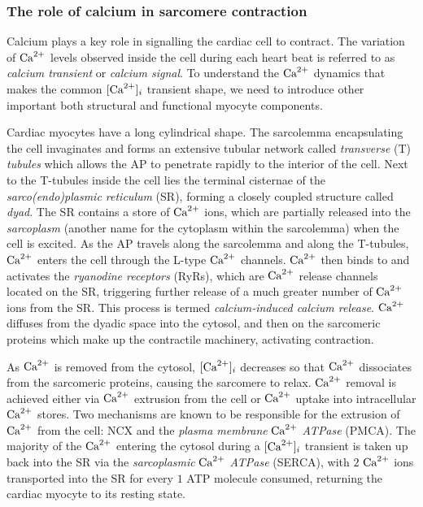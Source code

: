 

%
%
%
\subsubsection{The role of calcium in sarcomere contraction}\label{ch1:the_role_of_calcium_in_sarcomere_contraction}
Calcium plays a key role in signalling the cardiac cell to contract. The variation of $\textrm{Ca}^{2+}$ levels observed inside the cell during each heart beat is referred to as \textit{calcium transient} or \textit{calcium signal}. To understand the $\textrm{Ca}^{2+}$ dynamics that makes the common $[\textrm{Ca}^{2+}]_{i}$ transient shape, we need to introduce other important both structural and functional myocyte components.

\vspace{0.2cm}
Cardiac myocytes have a long cylindrical shape. The sarcolemma encapsulating the cell invaginates and forms an extensive tubular network called \textit{transverse} (\acs{T}) \textit{tubules} which allows the AP to penetrate rapidly to the interior of the cell. Next to the T-tubules inside the cell lies the terminal cisternae of the \textit{sarco(endo)plasmic reticulum} (\acs{SR}), forming a closely coupled structure called \textit{dyad}. The SR contains a store of $\textrm{Ca}^{2+}$ ions, which are partially released into the \textit{sarcoplasm} (another name for the cytoplasm within the sarcolemma) when the cell is excited. As the AP travels along the sarcolemma and along the T-tubules, $\textrm{Ca}^{2+}$ enters the cell through the L-type $\textrm{Ca}^{2+}$ channels. $\textrm{Ca}^{2+}$ then binds to and activates the \textit{ryanodine receptors} (\acs{RyR}s), which are $\textrm{Ca}^{2+}$ release channels located on the SR, triggering further release of a much greater number of $\textrm{Ca}^{2+}$ ions from the SR. This process is termed \textit{calcium-induced calcium release}. $\textrm{Ca}^{2+}$ diffuses from the dyadic space into the cytosol, and then on the sarcomeric proteins which make up the contractile machinery, activating contraction.

\vspace{0.2cm}
As $\textrm{Ca}^{2+}$ is removed from the cytosol, $[\textrm{Ca}^{2+}]_{i}$ decreases so that $\textrm{Ca}^{2+}$ dissociates from the sarcomeric proteins, causing the sarcomere to relax. $\textrm{Ca}^{2+}$ removal is achieved either via $\textrm{Ca}^{2+}$ extrusion from the cell or $\textrm{Ca}^{2+}$ uptake into intracellular $\textrm{Ca}^{2+}$ stores. Two mechanisms are known to be responsible for the extrusion of $\textrm{Ca}^{2+}$ from the cell: NCX and the \textit{plasma membrane} $\textrm{Ca}^{2+}$ \textit{ATPase} (\acs{PMCA}). The majority of the $\textrm{Ca}^{2+}$ entering the cytosol during a $[\textrm{Ca}^{2+}]_{i}$ transient is taken up back into the SR via the \textit{sarcoplasmic} $\textrm{Ca}^{2+}$ \textit{ATPase} (\acs{SERCA}), with $2$ $\textrm{Ca}^{2+}$ ions transported into the SR for every $1$ ATP molecule consumed, returning the cardiac myocyte to its resting state.



